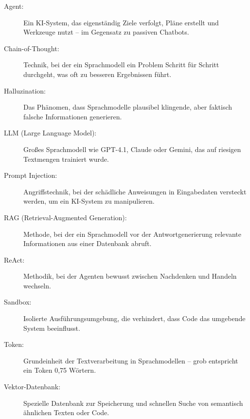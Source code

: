 \begin{description}
  \item[Agent:] Ein KI-System, das eigenständig Ziele verfolgt, Pläne erstellt und Werkzeuge nutzt – im Gegensatz zu passiven Chatbots.
  
  \item[Chain-of-Thought:] Technik, bei der ein Sprachmodell ein Problem Schritt für Schritt durchgeht, was oft zu besseren Ergebnissen führt.
  
  \item[Halluzination:] Das Phänomen, dass Sprachmodelle plausibel klingende, aber faktisch falsche Informationen generieren.
  
  \item[LLM (Large Language Model):] Großes Sprachmodell wie GPT-4.1, Claude oder Gemini, das auf riesigen Textmengen trainiert wurde.
  
  \item[Prompt Injection:] Angriffstechnik, bei der schädliche Anweisungen in Eingabedaten versteckt werden, um ein KI-System zu manipulieren.
  
  \item[RAG (Retrieval-Augmented Generation):] Methode, bei der ein Sprachmodell vor der Antwortgenerierung relevante Informationen aus einer Datenbank abruft.
  
  \item[ReAct:] Methodik, bei der Agenten bewusst zwischen Nachdenken und Handeln wechseln.
  
  \item[Sandbox:] Isolierte Ausführungsumgebung, die verhindert, dass Code das umgebende System beeinflusst.
  
  \item[Token:] Grundeinheit der Textverarbeitung in Sprachmodellen – grob entspricht ein Token 0,75 Wörtern.
  
  \item[Vektor-Datenbank:] Spezielle Datenbank zur Speicherung und schnellen Suche von semantisch ähnlichen Texten oder Code.
\end{description}
